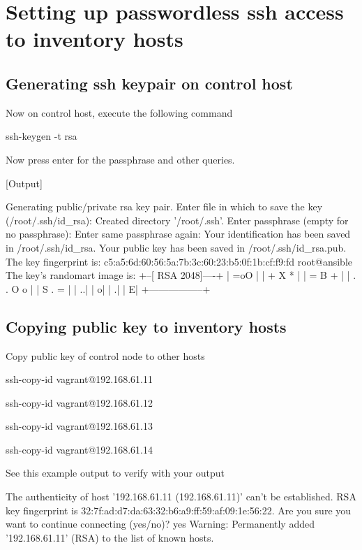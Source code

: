 \section{Setting up passwordless ssh access to inventory hosts}

\subsection{Generating ssh keypair on control host}

Now on control host, execute the following command

\begin{code}
ssh-keygen -t rsa
\end{code}

Now press enter for the passphrase and other queries.

[Output]\newline
\begin{code}
Generating public/private rsa key pair.
Enter file in which to save the key (/root/.ssh/id_rsa):
Created directory '/root/.ssh'.
Enter passphrase (empty for no passphrase):
Enter same passphrase again:
Your identification has been saved in /root/.ssh/id_rsa.
Your public key has been saved in /root/.ssh/id_rsa.pub.
The key fingerprint is:
c5:a5:6d:60:56:5a:7b:3c:60:23:b5:0f:1b:cf:f9:fd root@ansible
The key's randomart image is:
+--[ RSA 2048]----+
|          =oO    |
|         + X *   |
|          = B +  |
|         . . O o |
|        S   . =  |
|               ..|
|                o|
|                .|
|                E|
+-----------------+
\end{code}

\subsection{Copying public key to inventory hosts}

Copy public key of control node to other hosts  

\begin{code}
ssh-copy-id vagrant@192.168.61.11

ssh-copy-id vagrant@192.168.61.12

ssh-copy-id vagrant@192.168.61.13

ssh-copy-id vagrant@192.168.61.14
\end{code}

See this example output to verify with your output

\begin{code}
The authenticity of host '192.168.61.11 (192.168.61.11)' can't be established.
RSA key fingerprint is 32:7f:ad:d7:da:63:32:b6:a9:ff:59:af:09:1e:56:22.
Are you sure you want to continue connecting (yes/no)? yes
Warning: Permanently added '192.168.61.11' (RSA) to the list of known hosts.
\end{code}

